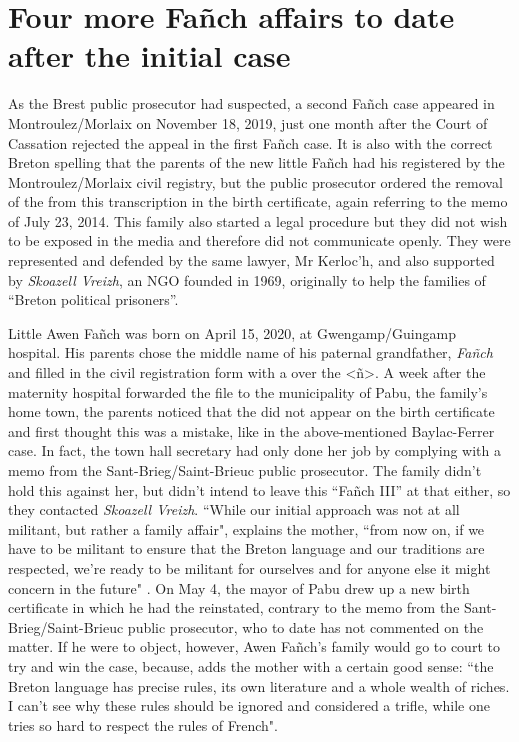 \documentclass[output=paper,colorlinks,citecolor=brown]{langscibook}
\begin{document}
\section{Four more Fañch affairs to date after the initial case}

As the Brest public prosecutor had suspected, a second Fañch case appeared in Montroulez/Morlaix on November 18, 2019, just one month after the Court of Cassation rejected the appeal in the first Fañch case. It is also with the correct Breton spelling that the parents of the new little Fañch had his  registered by the Montroulez/Morlaix civil registry, but the public prosecutor ordered the removal of the  from this transcription in the birth certificate, again referring to the memo of July 23, 2014. This family also started a legal procedure but they did not wish to be exposed in the media and therefore did not communicate openly. They were represented and defended by the same lawyer, Mr Kerloc'h, and also supported by \textit{Skoazell Vreizh}, an NGO founded in 1969, originally to help the families of ``Breton political prisoners”.

Little Awen Fañch was born on April 15, 2020, at Gwengamp/Guingamp hospital. His parents chose the middle name of his paternal grandfather, \textit{Fañch} and filled in the civil registration form with a  over the <ñ>. A week after the maternity hospital forwarded the file to the municipality of Pabu, the family's home town, the parents noticed that the  did not appear on the birth certificate and first thought this was a mistake, like in the above-mentioned Baylac-Ferrer case. In fact, the town hall secretary had only done her job by complying with a memo from the Sant-Brieg/Saint-Brieuc public prosecutor. The family didn't hold this against her, but didn't intend to leave this “Fañch III” at that either, so they contacted \textit{Skoazell Vreizh}. ``While our initial approach was not at all militant, but rather a family affair", explains the mother, ``from now on, if we have to be militant to ensure that the Breton language and our traditions are respected, we're ready to be militant for ourselves and for anyone else it might concern in the future" \citep{sm:LeFur2020}. On May 4, the mayor of Pabu drew up a new birth certificate in which he had the  reinstated, contrary to the memo from the Sant-Brieg/Saint-Brieuc public prosecutor, who to date has not commented on the matter. If he were to object, however, Awen Fañch's family would go to court to try and win the case, because, adds the mother with a certain good sense: ``the Breton language has precise rules, its own literature and a whole wealth of riches. I can't see why these rules should be ignored and considered a trifle, while one tries so hard to respect the rules of French".
\end{document}
